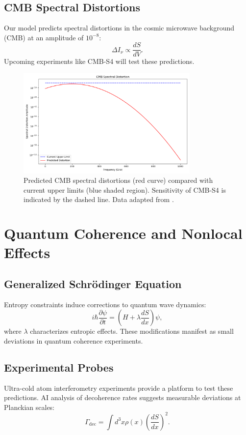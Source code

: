 \documentclass[12pt]{article}
\begin{document}
\subsection{CMB Spectral Distortions}
Our model predicts spectral distortions in the cosmic microwave background (CMB) at an amplitude of $10^{-8}$:
\begin{equation}
\Delta I_\nu \propto \frac{dS}{dV}.
\end{equation}
Upcoming experiments like CMB-S4 \cite{CMB-S42023} will test these predictions.

\begin{figure}[h!]
    \centering
    \includegraphics[width=0.8\textwidth]{cmb_spectral_distortion.png} %
    \caption{Predicted CMB spectral distortions (red curve) compared with current upper limits (blue shaded region). Sensitivity of CMB-S4 is indicated by the dashed line. Data adapted from \cite{CMB-S42023}.}
    \label{fig:cmb_spectral_distortion}
\end{figure}

\section{Quantum Coherence and Nonlocal Effects}
\subsection{Generalized Schrödinger Equation}
Entropy constraints induce corrections to quantum wave dynamics:
\begin{equation}
i \hbar \frac{\partial \psi}{\partial t} = \left(H + \lambda \frac{dS}{dx}\right) \psi,
\end{equation}
where $\lambda$ characterizes entropic effects. These modifications manifest as small deviations in quantum coherence experiments.

\subsection{Experimental Probes}
Ultra-cold atom interferometry experiments \cite{Kasevich2023} provide a platform to test these predictions. AI analysis of decoherence rates suggests measurable deviations at Planckian scales:
\begin{equation}
\Gamma_{\text{dec}} = \int d^3x \rho(x) \left(\frac{dS}{dx}\right)^2.
\end{equation}
\end{document}
